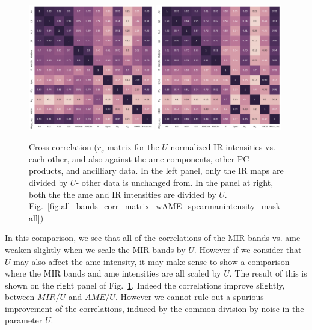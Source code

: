                 \begin{figure}
                    \includegraphics[width=0.49\textwidth,trim={0.2cm 0 0.25cm 0 },clip]{../Plots/ch_allsky/all_bands_corr_matrix_wAME_spearmanU_norm_masked.pdf}
                    \includegraphics[width=0.49\textwidth,trim={0.2cm 0 0.25cm 0 },clip]{../Plots/ch_allsky/all_bands_corr_matrix_wAME_spearmanU_norm_AMEnorm_masked.pdf}
                    \centering
                    \caption{Cross-correlation ($r_{s}$ matrix for the $U$-normalized IR intensities vs. each other, and also against the \acrshort{ame} components, other PC products, and ancilliary data. In the left panel, only the IR maps are divided by $U$- other data is unchanged from. In the panel at right, both the the \acrshort{ame} and IR intensities are divided by $U$. Fig.~\ref{fig:all_bands_corr_matrix_wAME_spearmanintensity_maskall})}
                    \label{fig:all_bands_corr_matrix_wAME_spearmanU_norm_masked}
                \end{figure}
            In this comparison, we see that all of the correlations of the MIR bands vs. \acrshort{ame} weaken slightly when we scale the MIR bands by $U$. However if we consider that $U$ may also affect the \acrshort{ame} intensity, it may make sense to show a comparison where the MIR bands and \acrshort{ame} intensities are all scaled by $U$. The result of this is shown on the right panel of Fig.~\ref{fig:all_bands_corr_matrix_wAME_spearmanU_norm_masked}. Indeed the correlations improve slightly, between $MIR/U$ and $AME/U$. However we cannot rule out a spurious improvement of the correlations, induced by the common division by noise in the parameter $U$.

